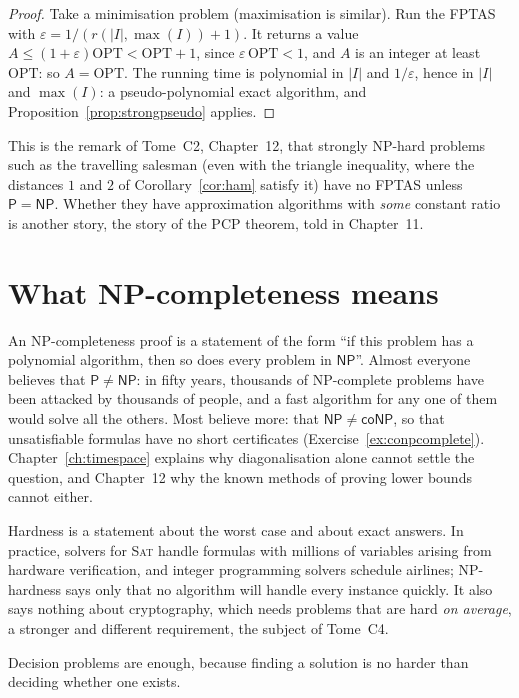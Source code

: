 \begin{proof}
Take a minimisation problem (maximisation is similar). Run the FPTAS with $\varepsilon=1/(r(|I|,\max(I))+1)$. It returns a value $A\le(1+\varepsilon)\mathrm{OPT}<\mathrm{OPT}+1$, since $\varepsilon\,\mathrm{OPT}<1$, and $A$ is an integer at least $\mathrm{OPT}$: so $A=\mathrm{OPT}$. The running time is polynomial in $|I|$ and $1/\varepsilon$, hence in $|I|$ and $\max(I)$: a pseudo-polynomial exact algorithm, and Proposition~\ref{prop:strongpseudo} applies.
\end{proof}

This is the remark of Tome~C2, Chapter~12, that strongly NP-hard problems such as the travelling salesman (even with the triangle inequality, where the distances $1$ and $2$ of Corollary~\ref{cor:ham} satisfy it) have no FPTAS unless $\mathsf P=\mathsf{NP}$. Whether they have approximation algorithms with \emph{some} constant ratio is another story, the story of the PCP theorem, told in Chapter~11.

\section{What NP-completeness means}\label{sec:meaning}

An NP-completeness proof is a statement of the form ``if this problem has a polynomial algorithm, then so does every problem in $\mathsf{NP}$''. Almost everyone believes that $\mathsf P\ne\mathsf{NP}$: in fifty years, thousands of NP-complete problems have been attacked by thousands of people, and a fast algorithm for any one of them would solve all the others. Most believe more: that $\mathsf{NP}\ne\mathsf{coNP}$, so that unsatisfiable formulas have no short certificates (Exercise~\ref{ex:conpcomplete}). Chapter~\ref{ch:timespace} explains why diagonalisation alone cannot settle the question, and Chapter~12 why the known methods of proving lower bounds cannot either.

Hardness is a statement about the worst case and about exact answers. In practice, solvers for \textup{\textsc{Sat}} handle formulas with millions of variables arising from hardware verification, and integer programming solvers schedule airlines; NP-hardness says only that no algorithm will handle every instance quickly. It also says nothing about cryptography, which needs problems that are hard \emph{on average}, a stronger and different requirement, the subject of Tome~C4.

Decision problems are enough, because finding a solution is no harder than deciding whether one exists.


